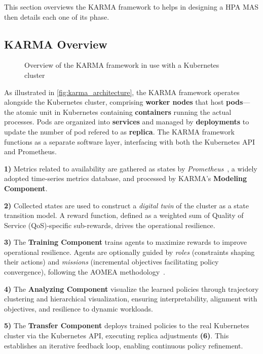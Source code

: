 \documentclass[conference]{IEEEtran}
\begin{document}
This section overviews the KARMA framework to helps in designing a HPA MAS then details each one of its phase.

\subsection{KARMA Overview}

\begin{figure}[h!]
    \centering
    
    \caption{Overview of the KARMA framework in use with a Kubernetes cluster}
    \label{fig:karma_architecture}
\end{figure}

As illustrated in \autoref{fig:karma_architecture}, the KARMA framework operates alongside the Kubernetes cluster, comprising \textbf{worker nodes} that host \textbf{pods}—the atomic unit in Kubernetes containing \textbf{containers} running the actual processes. Pods are organized into \textbf{services} and managed by \textbf{deployments} to update the number of pod refered to as \textbf{replica}. The KARMA framework functions as a separate software layer, interfacing with both the Kubernetes API and Prometheus.

\textbf{1)} Metrics related to availability are gathered as states by \textit{Prometheus}~\cite{prometheus}, a widely adopted time-series metrics database, and processed by KARMA's \textbf{Modeling Component}.

\textbf{2)} Collected states are used to construct a \textit{digital twin} of the cluster as a state transition model. A reward function, defined as a weighted sum of Quality of Service (QoS)-specific sub-rewards, drives the operational resilience. %

\textbf{3)} The \textbf{Training Component} trains agents to maximize rewards to improve operational resilience. Agents are optionally guided by \textit{roles} (constraints shaping their actions) and \textit{missions} (incremental objectives facilitating policy convergence), following the AOMEA methodology~\cite{soule2024aomea}.

\textbf{4)} The \textbf{Analyzing Component} visualize the learned policies through trajectory clustering and hierarchical visualization, ensuring interpretability, alignment with objectives, and resilience to dynamic workloads.

\textbf{5)} The \textbf{Transfer Component} deploys trained policies to the real Kubernetes cluster via the Kubernetes API, executing replica adjustments \textbf{(6)}. This establishes an iterative feedback loop, enabling continuous policy refinement.
\end{document}
